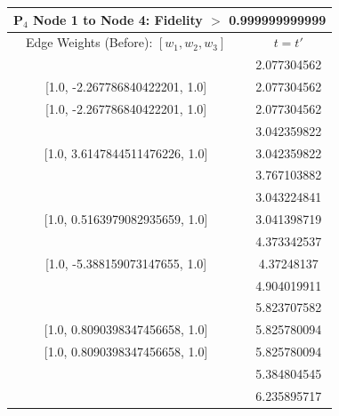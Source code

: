 \documentclass[reprint, aps, 12pt, floatfix]{revtex4-2}
\begin{document}
\begin{center}
    \begin{tabular}{||c c||}
        \multicolumn{2}{c}{P$_4$ Node 1 to Node 4: Fidelity $>$ 0.999999999999}\\
        \hline
        Edge Weights (Before): $[w_1,w_2,w_3]$&$t=t'$\\
        \hline
        [1.0, -2.267786840422201, 1.0]&2.077304562\\

        [1.0, -2.267786840422201, 1.0]&2.077304562\\

        [1.0, -2.267786840422201, 1.0]&2.077304562\\
        \hline
        [1.0, 3.6147844511476226, 1.0]&3.042359822\\

        [1.0, 3.6147844511476226, 1.0]&3.042359822\\
        \hline
        [1.0, 4.587317100652229, 1.0]&3.767103882\\
        \hline
        [1.0, 0.5163977791040121, 1.0]&3.043224841\\
        
        [1.0, 0.5163979082935659, 1.0]&3.041398719\\
        \hline
        [1.0, -5.388159048452486, 1.0]&4.373342537\\

        [1.0, -5.388159073147655, 1.0]&4.37248137\\
        \hline
        [1.0, 1.6012815385662786, 1.0]&4.904019911\\
        \hline
        [1.0, 0.8090399266807671, 1.0]&5.823707582\\

        [1.0, 0.8090398347456658, 1.0]&5.825780094\\

        [1.0, 0.8090398347456658, 1.0]&5.825780094\\
        \hline
        [1.0, 6.709789588696451, 1.0]&5.384804545\\
        \hline
        [1.0, -0.2519763151128192, 1.0]&6.235895717\\
        \hline
    \end{tabular}
\end{center}
\end{document}
